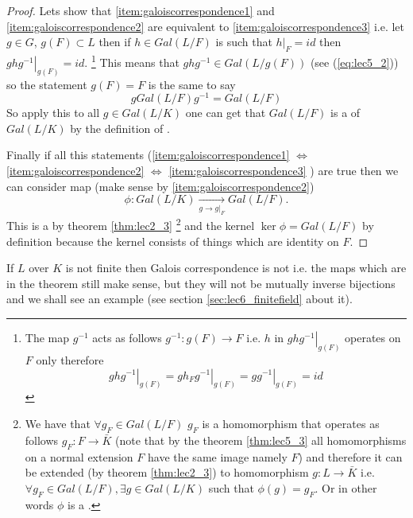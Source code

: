 \begin{theorem}
\begin{proof}
    Lets show that \ref{item:galoiscorrespondence1} and
    \ref{item:galoiscorrespondence2} are equivalent to
    \ref{item:galoiscorrespondence3} i.e. let $g \in G$,
    $g\left(F\right) \subset L$ then if
    $h \in Gal\left(L/F\right)$ is such that $\left.h\right|_F = id$
    then $\left.g h g^{-1}\right|_{g\left(F\right)} = id$.
    \footnote{
      The map $g^{-1}$ acts as follows $g^{-1}: g(F) \to F$ i.e. $h$
      in $\left.g h g^{-1}\right|_{g\left(F\right)}$ operates on $F$
      only therefore
      \[
      \left.g h g^{-1}\right|_{g\left(F\right)} =
      \left.g h_F g^{-1}\right|_{g\left(F\right)}  =
      \left.g g^{-1}\right|_{g\left(F\right)} = id
      \]
    }
    This means
    that $g h g^{-1} \in Gal\left(L/g\left(F\right)\right)$ (see
    (\ref{eq:lec5_2})) so the 
    statement $g\left(F\right) = F$ is the same to say
    \[
    g Gal\left(L/F\right) g^{-1} = Gal\left(L/F\right)
    \]
    So apply this to all $g \in Gal\left(L/K\right)$ one can get that
    $Gal\left(L/F\right)$ is a  of
    $Gal\left(L/K\right)$ by the definition of
    . 

    Finally if all this statements
    (\ref{item:galoiscorrespondence1}
    $\Longleftrightarrow$
    \ref{item:galoiscorrespondence2}
    $\Longleftrightarrow$
    \ref{item:galoiscorrespondence3}
    ) are true then we can consider map (make sense by
    \ref{item:galoiscorrespondence2}) 
    \[
    \phi: Gal\left(L/K\right)
    \xrightarrow[g \to \left.g\right|_F]{}
    Gal\left(L/F\right).
    \]
    This is a  by theorem \ref{thm:lec2_3}
    \footnote{
      We have that $\forall g_F \in Gal\left(L/F\right)$ $g_F$ is a
      homomorphism that operates as follows $g_F: F \to \bar{K}$
      (note that by the theorem \ref{thm:lec5_3} all homomorphisms on
      a normal extension $F$ have the same image namely $F$)
      and
      therefore it can be extended (by theorem 
      \ref{thm:lec2_3}) to homomorphism $g: L \to \bar{K}$
      i.e. $\forall g_F \in  Gal\left(L/F\right), \exists g \in
      Gal\left(L/K\right)$ such that $\phi(g) = g_F$. Or in other
      words $\phi$ is a .
    }
    and the kernel $\ker \phi = Gal\left(L/F\right)$ by
    definition because the kernel consists of things which are identity on $F$. 
  \end{proof}
  \label{thm:galoiscorrespondence}
\end{theorem}

\begin{remark}
  If $L$ over $K$ is not finite then Galois correspondence is not
   i.e. the maps which are in the theorem still
  make sense, but they will not be mutually inverse bijections and we
  shall see an example (see section \ref{sec:lec6_finitefield} about it).
  \label{rem:lec6_gcnotbijection}
\end{remark}

